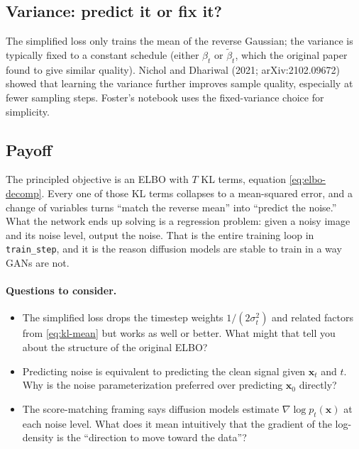 \documentclass[11pt]{article}
\theoremstyle{remark}
\begin{document}
\subsection{Variance: predict it or fix it?}

The simplified loss only trains the mean of the reverse Gaussian; the variance is typically fixed to a constant schedule (either $\beta_t$ or $\tilde{\beta}_t$, which the original paper found to give similar quality). Nichol and Dhariwal (2021; arXiv:2102.09672) showed that learning the variance further improves sample quality, especially at fewer sampling steps. Foster's notebook uses the fixed-variance choice for simplicity.

\subsection{Payoff}

The principled objective is an ELBO with $T$ KL terms, equation \eqref{eq:elbo-decomp}. Every one of those KL terms collapses to a mean-squared error, and a change of variables turns ``match the reverse mean'' into ``predict the noise.'' What the network ends up solving is a regression problem: given a noisy image and its noise level, output the noise. That is the entire training loop in \texttt{train\_step}, and it is the reason diffusion models are stable to train in a way GANs are not.

\paragraph{Questions to consider.}
\begin{itemize}[leftmargin=1.5em]
\item The simplified loss drops the timestep weights $1/(2\sigma_t^2)$ and related factors from \eqref{eq:kl-mean} but works as well or better. What might that tell you about the structure of the original ELBO?
\item Predicting noise is equivalent to predicting the clean signal given $\mathbf{x}_t$ and $t$. Why is the noise parameterization preferred over predicting $\mathbf{x}_0$ directly?
\item The score-matching framing says diffusion models estimate $\nabla \log p_t(\mathbf{x})$ at each noise level. What does it mean intuitively that the gradient of the log-density is the ``direction to move toward the data''?
\end{itemize}

\end{document}
